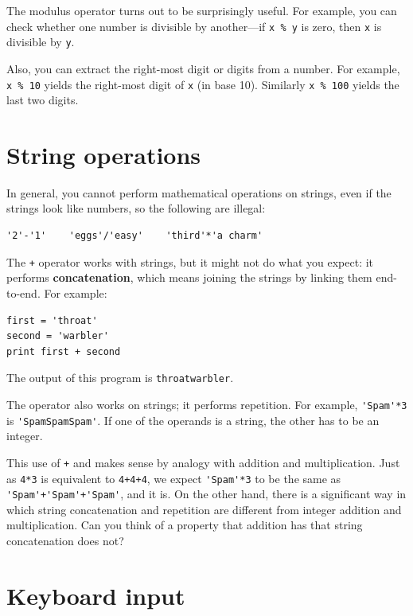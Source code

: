 \documentclass[10pt]{book}
\begin{document}
The modulus operator turns out to be surprisingly useful.  For
example, you can check whether one number is divisible by another---if
{\tt x \% y} is zero, then {\tt x} is divisible by {\tt y}.


Also, you can extract the right-most digit
or digits from a number.  For example, {\tt x \% 10} yields the
right-most digit of {\tt x} (in base 10).  Similarly {\tt x \% 100}
yields the last two digits.



\section{String operations}

In general, you cannot perform mathematical operations on strings, even
if the strings look like numbers, so the following are illegal:

\beforeverb
\begin{verbatim}
'2'-'1'    'eggs'/'easy'    'third'*'a charm'
\end{verbatim}
\afterverb
%
The {\tt +} operator works with strings, but it
might not do what you expect: it performs
{\bf concatenation}, which means joining the strings by
linking them end-to-end.  For example:


\beforeverb
\begin{verbatim}
first = 'throat'
second = 'warbler'
print first + second
\end{verbatim}
\afterverb
%
The output of this program is {\tt throatwarbler}.

The {\tt *} operator also works on strings; it performs repetition.
For example, \verb"'Spam'*3" is \verb"'SpamSpamSpam'".  If one of the operands
is a string, the other has to be an integer.

This use of {\tt +} and {\tt *} makes sense by
analogy with addition and multiplication.  Just as {\tt 4*3} is
equivalent to {\tt 4+4+4}, we expect \verb"'Spam'*3" to be the same as
\verb"'Spam'+'Spam'+'Spam'", and it is.  On the other hand, there is a
significant way in which string concatenation and repetition are
different from integer addition and multiplication.
Can you think of a property that addition has
that string concatenation does not?


\section{Keyboard input}
\end{document}
